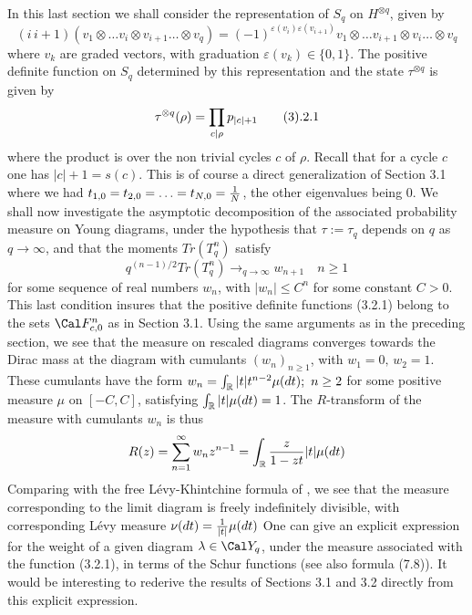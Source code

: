 In this last section we shall consider the representation of $S_q$ on
$H^{\otimes q}$, given by 
$$(i\,i+1)(v_1\otimes \ldots v_i\otimes v_{i+1} \ldots\otimes v_q)
=(-1)^{\varepsilon(v_i)\varepsilon
(v_{i+1})}v_1\otimes\ldots v_{i+1}\otimes v_{i} \ldots\otimes v_q$$
where $v_k$ are graded vectors, with graduation $\varepsilon(v_k)\in\{0,1\}$. 
The positive
definite function on $S_q$ determined by this representation and the
 state $\tau^{\otimes q}$ is given
by
$$\tau^{\otimes q}(\rho)=\prod_{c|\rho}p_{\vert c\vert+1}\tag 3.2.1$$
where the product is over the non trivial cycles $c$ of $\rho$. Recall that for
a cycle $c$ one has $|c|+1=s(c)$.
This is of
course a direct generalization of Section 3.1 where we had $t_{1,0}
=t_{2,0}=\ldots
=t_{N,0}={1\over N}$, the other eigenvalues being 0. We shall now investigate the
asymptotic decomposition of the associated probability measure on Young
diagrams, under the hypothesis that  $\tau:=\tau_q$ depends on $q$ as
$q\to\infty$, and that the moments $Tr(T_q^n)$ satisfy
$$q^{(n-1)/2}Tr(T_q^n) \to_{q\to\infty} w_{n+1}\quad n\geq 1$$
for some sequence of real numbers $w_n$, with $|w_n|\leq C^{n}$ for some
constant $C>0$. This last condition insures that the positive definite functions
(3.2.1) belong to the sets $\Cal F^n_{c,0}$ as in Section 3.1.
  Using
the same arguments as in the preceding section, we see that the measure
on rescaled diagrams converges towards the Dirac mass at the diagram with
cumulants
$(w_n)_{n\geq 1}$, with $w_1=0,\,w_2=1$.
 These cumulants have the form $w_n=\int_{\Bbb R} |t|t^{n-2}\mu(dt);\ n\geq 2$
 for some positive measure $\mu$ on $[-C,C]$,
satisfying $\int_{\Bbb R} |t|\mu(dt)=1$. The $R$-transform of the measure
with cumulants $w_n$ is thus 
$$R(z)=\sum_{n=1}^{\infty} w_nz^{n-1}=\int_{\Bbb R}{z\over 1-zt}|t|\mu(dt)$$
Comparing with the free L\'evy-Khintchine formula of
\cite{BV}, we see that the  measure corresponding to the limit diagram
is freely
indefinitely divisible, with corresponding L\'evy measure $\nu(dt)={1\over |t|}
\mu(dt)$
 One can give an explicit expression for the weight of a given
diagram $\lambda\in\Cal Y_q$, under the measure associated with the function
(3.2.1), in terms of
the Schur functions (see also \cite {M} formula (7.8)). It would be interesting
to rederive the results of Sections 3.1 and 3.2 directly from this explicit
expression.\endproclaim

\widestnumber {}
\Refs{}

